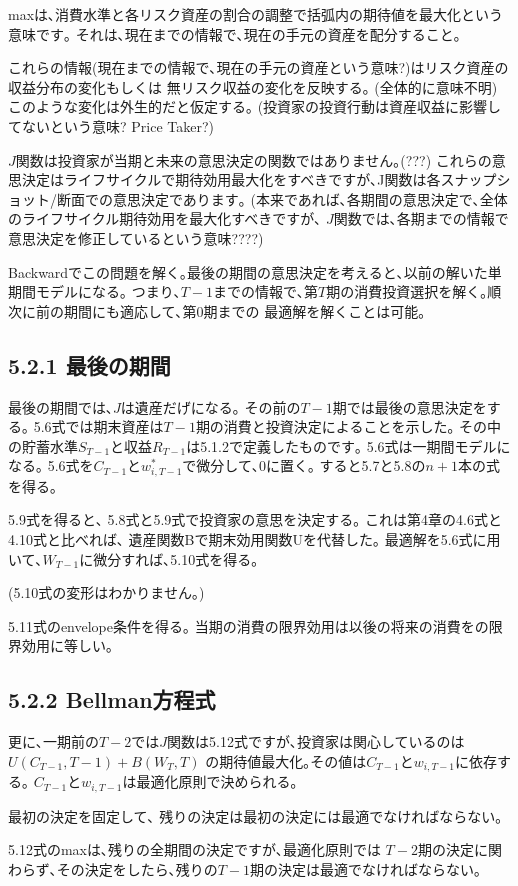 \documentclass[uplatex,a4paper]{jsarticle}
\begin{document}
maxは､消費水準と各リスク資産の割合の調整で括弧内の期待値を最大化という意味です｡
それは､現在までの情報で､現在の手元の資産を配分すること｡

これらの情報(現在までの情報で､現在の手元の資産という意味?)はリスク資産の収益分布の変化もしくは
無リスク収益の変化を反映する｡
(全体的に意味不明)
このような変化は外生的だと仮定する｡
(投資家の投資行動は資産収益に影響してないという意味? Price Taker?)

$J$関数は投資家が当期と未来の意思決定の関数ではありません｡(???)
これらの意思決定はライフサイクルで期待効用最大化をすべきですが､J関数は各スナップショット/断面での意思決定であります｡
(本来であれば､各期間の意思決定で､全体のライフサイクル期待効用を最大化すべきですが､
$J$関数では､各期までの情報で意思決定を修正しているという意味????)

Backwardでこの問題を解く｡最後の期間の意思決定を考えると､以前の解いた単期間モデルになる｡
つまり､$T-1$までの情報で､第$T$期の消費投資選択を解く｡順次に前の期間にも適応して､第$0$期までの
最適解を解くことは可能｡
\subsection*{5.2.1 最後の期間}
最後の期間では､$J$は遺産だげになる｡
その前の$T-1$期では最後の意思決定をする｡
5.6式では期末資産は$T-1$期の消費と投資決定によることを示した｡
その中の貯蓄水準$S_{T-1}$と収益$R_{T-1}$は5.1.2で定義したものです｡
5.6式は一期間モデルになる｡
5.6式を$C_{T-1}$と$w_{i,T-1}^*$で微分して､0に置く｡
すると5.7と5.8の$n+1$本の式を得る｡

5.9式を得ると､ 5.8式と5.9式で投資家の意思を決定する｡
これは第4章の4.6式と4.10式と比べれば､ 遺産関数Bで期末効用関数Uを代替した｡
最適解を5.6式に用いて､$W_{T-1}$に微分すれば､5.10式を得る｡

(5.10式の変形はわかりません｡)

5.11式のenvelope条件を得る｡
当期の消費の限界効用は以後の将来の消費をの限界効用に等しい｡
\subsection*{5.2.2 Bellman方程式}
更に､一期前の$T-2$では$J$関数は5.12式ですが､投資家は関心しているのは
$U(C_{T-1},T-1)+B(W_T,T)$
の期待値最大化｡その値は$C_{T-1}$と${w_{i,T-1}}$に依存する｡
$C_{T-1}$と${w_{i,T-1}}$は最適化原則で決められる｡

最初の決定を固定して､ 残りの決定は最初の決定には最適でなければならない｡

5.12式のmaxは､残りの全期間の決定ですが､最適化原則では
$T-2$期の決定に関わらず､その決定をしたら､残りの$T-1$期の決定は最適でなければならない｡
\end{document}
